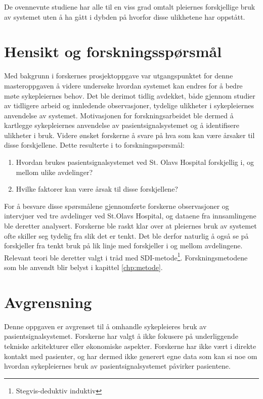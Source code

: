 \noindent
De ovennevnte studiene har alle til en viss grad omtalt pleiernes forskjellige bruk av systemet uten å ha gått i dybden på hvorfor disse ulikhetene har oppstått.

\section{Hensikt og forskningsspørsmål}
Med bakgrunn i forskernes prosjektoppgave \citep{Sund13} var utgangspunktet for denne masteroppgaven å videre undersøke hvordan systemet kan endres for å bedre møte sykepleiernes behov. Det ble derimot tidlig avdekket, både gjennom studier av tidligere arbeid og innledende observasjoner, tydelige ulikheter i sykepleiernes anvendelse av systemet. Motivasjonen for forskningsarbeidet ble dermed å kartlegge sykepleiernes anvendelse av pasientsignalsystemet og å identifisere ulikheter i bruk. Videre ønsket forskerne å svare på hva som kan være årsaker til disse forskjellene. Dette resulterte i to forskningsspørsmål:

\begin{enumerate}
\item Hvordan brukes pasientsignalsystemet ved St. Olavs Hospital forskjellig i, og mellom ulike avdelinger? 
\item Hvilke faktorer kan være årsak til disse forskjellene?
\end{enumerate}

\noindent
For å besvare disse spørsmålene gjennomførte forskerne observasjoner og intervjuer ved tre avdelinger ved St.Olavs Hospital, og dataene fra innsamlingene ble deretter analysert. Forskerne ble raskt klar over at pleiernes bruk av systemet ofte skiller seg tydelig fra slik det er tenkt. Det ble derfor naturlig å også se på forskjeller fra tenkt bruk på lik linje med forskjeller i og mellom avdelingene. Relevant teori ble deretter valgt i tråd med SDI-metode\footnote{Stegvis-deduktiv induktiv }. Forskningsmetodene som ble anvendt blir belyst i kapittel \ref{chp:metode}.

\section{Avgrensning}
Denne oppgaven er avgrenset til å omhandle sykepleieres bruk av pasientsignalsystemet. Forskerne har valgt å ikke fokusere på underliggende tekniske arkitekturer eller økonomiske aspekter. Forskerne har ikke vært i direkte kontakt med pasienter, og har dermed ikke generert egne data som kan si noe om hvordan sykepleiernes bruk av pasientsignalsystemet påvirker pasientene. 

